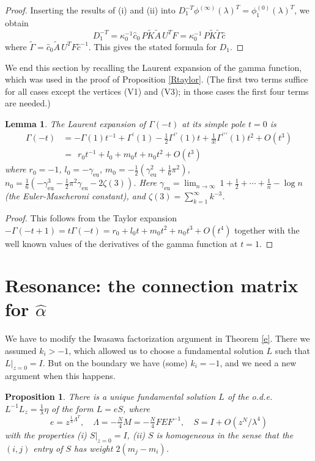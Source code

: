 \documentclass[a4paper,12pt,leqno]{amsart}
\numberwithin{equation}{section}
\theoremstyle{plain}
\newtheorem{proposition}[theorem]{Proposition}
\newtheorem{lemma}[theorem]{Lemma}
\theoremstyle{definition}
\newcommand{\al}{\alpha}
\newcommand{\la}{\lambda}
\newcommand{\Ga}{\Gamma}
\newcommand{\ka}{\kappa}
\newcommand{\no}{\noindent}
\newcommand{\pr}{\prime}
\newcommand{\phiz}{\phi^{(0)}}
\newcommand{\phii}{\phi^{(\infty)}}
\newcommand{\nn}{m}
\newcommand{\NN}{M}
\newcommand{\MM}{\Lambda}
\newcommand{\Asharp}{\Ga}
\newcommand{\euler}{\gamma_{\scriptscriptstyle\text{eu}}}
\begin{document}
{\begin{proof}
\no{\em (iii) The computation of $D_1$.}  
Inserting the results of (i) and (ii) into 
$D_1^{-T} {\phii}(\la)^T = {\phiz_1}(\la)^T$, we obtain
\[
D_1^{-T} = \ka_0^{-1}\hat c_0 \, P\tilde K \tilde A\,  U^T \!F = 
 \ka_0^{-1} \, P\tilde K \tilde \Asharp \hat c
\]
where $\tilde\Asharp=\hat c_0  \tilde A\, U^T \!F \hat c^{-1}$.
This gives the stated formula for $D_1$.
\end{proof}

We end this section by recalling the Laurent expansion of the gamma function, which was used in the proof 
of Proposition \ref{Rtaylor}.  (The first two terms suffice for all cases except the vertices (V1) and (V3); in those cases the first four terms are needed.)

\begin{lemma}\label{laurent}   
The Laurent expansion of $\Ga(-t)$ at its simple pole $t=0$ is
\begin{align*}
\Ga(-t)&=-\Ga(1)t^{-1}
+\Ga^\pr(1)
-\tfrac12\Ga^{\pr\pr}(1)t
+\tfrac1{3!} \Ga^{\pr\pr\pr}(1)t^2
+ O(t^3)\\
&=
\ \ r_0 t^{-1} + l_0 + m_0 t + n_0 t^2 + O(t^3)
\end{align*}
where
$r_0 =-1$,
$l_0 =-\euler$,
$m_0 =-\tfrac12(\euler^2+\tfrac16 \pi^2)$,
$n_0 =\tfrac16(-\euler^3-\tfrac12\pi^2\euler-2\zeta(3))$.
Here
$\euler=\lim_{n\to\infty} \ 
1+\tfrac 12+\cdots+\tfrac1n - \log n$ (the Euler-Mascheroni constant), and
$\zeta(3)=\sum_{k=1}^\infty k^{-3}$.
\end{lemma}

\begin{proof} This follows from the Taylor expansion
$-\Ga(-t+1)=t\Ga(-t)=r_0 + l_0 t + m_0 t^2 + n_0 t^3 + O(t^4)$
together with the well known values of the derivatives of the gamma function at $t=1$.
\end{proof}


\section{Resonance: the connection matrix for $\hat\al$}\label{resE1}

We have to modify the Iwasawa factorization argument in Theorem \ref{e}.
There we assumed $k_i>-1$, 
which allowed us to choose a fundamental solution $L$ such that $L\vert_{z=0}=I$.  But on the boundary we have (some) $k_i=-1$, and we need a new argument when this happens.  

\begin{proposition}\label{Rzfrob} There is a unique fundamental solution $L$ of the o.d.e.\ $L^{-1}L_z = \tfrac1\la \eta$ 
of the form $L=eS$, where
\[
e= z^{\frac1\la \MM^T},
\quad
\MM=
-\tfrac N4\NN = -\tfrac N4 FEF^{-1},
\quad
S=I+O(z^N/\la^4)
\]
with the properties (i) $S\vert_{z=0}=I$, (ii) $S$ is homogeneous in the sense that the $(i,j)$ entry of $S$ has weight $2(\nn_j-\nn_i)$.
\end{proposition} 

}
\end{document}
